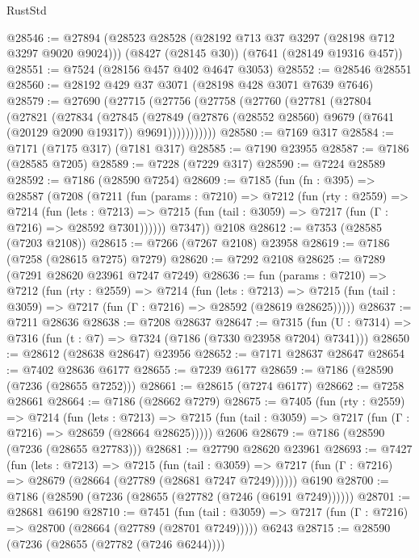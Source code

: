 \begin{lexlean}{RustStd}
\begin{coremodule}
@28546 := @27894
    (@28523 @28528 (@28192 @713 @37 @3297 (@28198 @712 @3297 @9020 @9024)))
    (@8427 (@28145 @30))
    (@7641 (@28149 @19316 @457))
@28551 := @7524 (@28156 @457 @402 @4647 @3053)
@28552 := @28546 @28551
@28560 := @28192 @429 @37 @3071 (@28198 @428 @3071 @7639 @7646)
@28579 := @27690
    (@27715
      (@27756
        (@27758
          (@27760
            (@27781
              (@27804
                (@27821
                  (@27834
                    (@27845
                      (@27849
                        (@27876 (@28552 @28560) @9679 (@7641 (@20129 @2090 @19317)) @9691)))))))))))
@28580 := @7169 @317
@28584 := @7171 (@7175 @317) (@7181 @317)
@28585 := @7190 @23955
@28587 := @7186 (@28585 @7205)
@28589 := @7228 (@7229 @317)
@28590 := @7224 @28589
@28592 := @7186 (@28590 @7254)
@28609 := @7185
    (fun (fn : @395) =>
    @28587
      (@7208
        (@7211
          (fun (params : @7210) =>
          @7212
            (fun (rty : @2559) =>
            @7214
              (fun (lets : @7213) =>
              @7215 (fun (tail : @3059) => @7217 (fun (Γ : @7216) => @28592 @7301))))))
        @7347))
    @2108
@28612 := @7353 (@28585 (@7203 @2108))
@28615 := @7266 (@7267 @2108) @23958
@28619 := @7186 (@7258 (@28615 @7275) @7279)
@28620 := @7292 @2108
@28625 := @7289 (@7291 @28620 @23961 @7247 @7249)
@28636 := fun (params : @7210) =>
  @7212
    (fun (rty : @2559) =>
    @7214
      (fun (lets : @7213) =>
      @7215 (fun (tail : @3059) => @7217 (fun (Γ : @7216) => @28592 (@28619 @28625)))))
@28637 := @7211 @28636
@28638 := @7208 @28637
@28647 := @7315
    (fun (U : @7314) => @7316 (fun (t : @7) => @7324 (@7186 (@7330 @23958 @7204) @7341)))
@28650 := @28612 (@28638 @28647) @23956
@28652 := @7171 @28637 @28647
@28654 := @7402 @28636 @6177
@28655 := @7239 @6177
@28659 := @7186 (@28590 (@7236 (@28655 @7252)))
@28661 := @28615 (@7274 @6177)
@28662 := @7258 @28661
@28664 := @7186 (@28662 @7279)
@28675 := @7405
    (fun (rty : @2559) =>
    @7214
      (fun (lets : @7213) =>
      @7215 (fun (tail : @3059) => @7217 (fun (Γ : @7216) => @28659 (@28664 @28625)))))
    @2606
@28679 := @7186 (@28590 (@7236 (@28655 @27783)))
@28681 := @27790 @28620 @23961
@28693 := @7427
    (fun (lets : @7213) =>
    @7215
      (fun (tail : @3059) =>
      @7217 (fun (Γ : @7216) => @28679 (@28664 (@27789 (@28681 @7247 @7249))))))
    @6190
@28700 := @7186 (@28590 (@7236 (@28655 (@27782 (@7246 (@6191 @7249))))))
@28701 := @28681 @6190
@28710 := @7451
    (fun (tail : @3059) => @7217 (fun (Γ : @7216) => @28700 (@28664 (@27789 (@28701 @7249)))))
    @6243
@28715 := @28590 (@7236 (@28655 (@27782 (@7246 @6244))))

\end{coremodule}
\end{lexlean}
